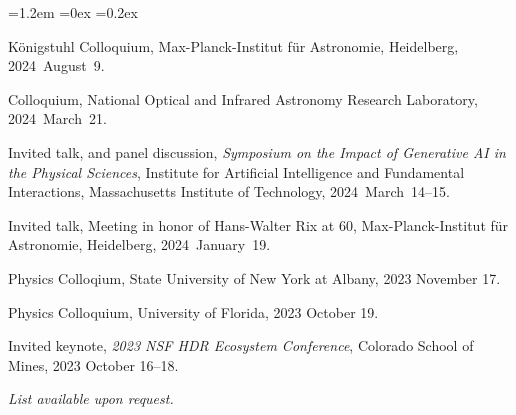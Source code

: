 \documentclass[10pt,letterpaper]{article}
\newcounter{refpubnum}
\newcommand{\hogglist}{%
    \rightmargin=0in
    \leftmargin=1.2em
    \topsep=0ex
    \partopsep=0pt
    \itemsep=0.2ex
    \parsep=0pt
    \itemindent=-1.0\leftmargin
    \listparindent=0.0\leftmargin
    \settowidth{\labelsep}{~}
    \usecounter{refpubnum}
  }
\begin{document}
\begin{list}{}{\hogglist}
{\item K\"onigstuhl Colloquium, Max-Planck-Institut f\"ur Astronomie, Heidelberg, 2024~August~9.
\item Colloquium, National Optical and Infrared Astronomy Research Laboratory, 2024~March~21.
\item Invited talk, and panel discussion, \textit{Symposium on the Impact of Generative AI in the Physical Sciences}, Institute for Artificial Intelligence and Fundamental Interactions, Massachusetts Institute of Technology, 2024~March~14--15.
\item Invited talk, Meeting in honor of Hans-Walter Rix at 60, Max-Planck-Institut f\"ur Astronomie, Heidelberg, 2024~January~19.
\item Physics Colloqium, State University of New York at Albany, 2023 November 17.
\item Physics Colloquium, University of Florida, 2023 October 19.
\item Invited keynote, \textit{2023 NSF HDR Ecosystem Conference}, Colorado School of Mines, 2023 October 16--18.
}{%
\item \textit{List available upon request.}
}%
\end{list}
\end{document}
